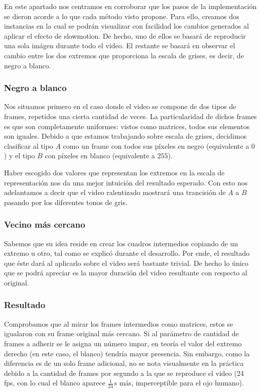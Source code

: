 En este apartado nos centramos en corroborar que los pasos de la implementaci\'on se dieron acorde a lo que cada m\'etodo visto propone. Para ello, creamos dos instancias en la cual se podr\'an visualizar con facilidad los cambios generados al aplicar el efecto de slowmotion. De hecho, uno de ellos se basar\'a de reproducir una sola im\'agen durante todo el video. El restante se basar\'a en observar el cambio entre los dos extremos que proporciona la escala de grises, es decir, de negro a blanco.
\subsubsection{Negro a blanco}

Nos situamos primero en el caso donde el video se compone de dos tipos de frames, repetidos una cierta cantidad de veces. La particularidad de dichos frames es que son completamente uniformes: vistos como matrices, todos sus elementos son iguales. Debido a que estamos trabajando sobre escala de grises, decidimos clasificar al tipo $A$ como un frame con todos sus p\'ixeles en negro (equivalente a $0$) y el tipo $B$ con p\'ixeles en blanco (equivalente a $255$).

Haber escogido dos valores que representan los extremos en la escala de representaci\'on nos da una mejor intuici\'on del resultado esperado. Con esto nos adelantamos a decir que el video ralentizado mostrará una trancisión de $A$ a $B$ pasando por los diferentes tonos de gris.

\subsubsection*{\bf{Vecino m\'as cercano}}

Sabemos que su idea reside en crear los cuadros intermedios copiando de un extremo u otro, tal como se explic\'o durante el desarrollo. Por ende, el resultado que \'este dar\'a al aplicarlo sobre el video ser\'a bastante trivial. De hecho lo \'unico que se podr\'a apreciar es la mayor duraci\'on del video resultante con respecto al original.

\subsubsection*{Resultado}

Comprobamos que al mirar los frames intermedios como matrices, estos se igualaron con su frame original m\'as cercano. Si al par\'ametro de cantidad de frames a adherir se le asigna un n\'umero impar, en teor\'ia el valor del extremo derecho (en este caso, el blanco) tendr\'ia mayor presencia. Sin embargo, como la diferencia es de un solo frame adicional, no se nota visualmente en la pr\'actica debido a la cantidad de frames por segundo a la que se reproduce el video (24 fps, con lo cual el blanco aparece $\frac{1}{24}s$ más, imperceptible para el ojo humano).

